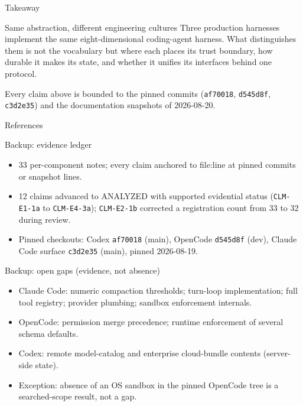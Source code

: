 \documentclass[aspectratio=169,11pt]{beamer}
\newcommand{\codex}[0]{Codex}
\newcommand{\occ}[0]{OpenCode}
\newcommand{\ccc}[0]{Claude Code}
\begin{document}
\begin{frame}{Takeaway}
  \begin{block}{Same abstraction, different engineering cultures}
    Three production harnesses implement the same eight-dimensional
    coding-agent harness. What distinguishes them is not the vocabulary
    but where each places its trust boundary, how durable it makes its
    state, and whether it unifies its interfaces behind one protocol.
  \end{block}
  \medskip
  Every claim above is bounded to the pinned commits
  (\texttt{af70018}, \texttt{d545d8f}, \texttt{c3d2e35}) and the
  documentation snapshots of 2026-08-20.
\end{frame}

\begin{frame}[allowframebreaks]{References}
  \footnotesize
  
  
\end{frame}

\appendix

\begin{frame}{Backup: evidence ledger}
  \begin{itemize}
    \item 33 per-component notes; every claim anchored to file:line at
      pinned commits or snapshot lines.
    \item 12 claims advanced to ANALYZED with supported evidential
      status (\texttt{CLM-E1-1a} to \texttt{CLM-E4-3a});
      \texttt{CLM-E2-1b} corrected a registration count from 33 to 32
      during review.
    \item Pinned checkouts: \codex{} \texttt{af70018} (main), \occ{}
      \texttt{d545d8f} (dev), \ccc{} surface \texttt{c3d2e35} (main),
      pinned 2026-08-19.
  \end{itemize}
\end{frame}

\begin{frame}{Backup: open gaps (evidence, not absence)}
  \begin{itemize}
    \item \ccc{}: numeric compaction thresholds; turn-loop
      implementation; full tool registry; provider plumbing; sandbox
      enforcement internals.
    \item \occ{}: permission merge precedence; runtime enforcement of
      several schema defaults.
    \item \codex{}: remote model-catalog and enterprise cloud-bundle
      contents (server-side state).
    \item Exception: absence of an OS sandbox in the pinned \occ{} tree
      is a searched-scope result, not a gap.
  \end{itemize}
\end{frame}
\end{document}
